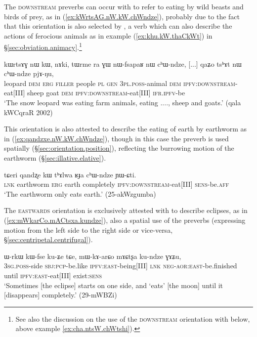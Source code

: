 The \textsc{downstream} preverbs can occur with  to refer to eating by wild beasts and birds of prey, as in (\ref{ex:kWrtsAG.nW.kW.chWndze}), probably due to the fact that this orientation is also selected by , a verb which can also describe the actions of ferocious animals as in example (\ref{ex:khu.kW.thaCkWt}) in §\ref{sec:obviation.animacy}.\footnote{See also the discussion on the use of the \textsc{downstream} orientation with  below, above example \ref{ex:cha.ntsW.chWtshi}).}

\begin{exe}
\ex \label{ex:kWrtsAG.nW.kW.chWndze}
\gll kɯrtsɤɣ nɯ kɯ, nɤki, tɯrme ra ɣɯ nɯ-fsapaʁ nɯ cʰɯ-ndze, [...] qaʑo tsʰɤt nɯ cʰɯ-ndze pjɤ-ŋu, \\
leopard \textsc{dem} \textsc{erg} \textsc{filler} people \textsc{pl} \textsc{gen} \textsc{3pl}.\textsc{poss}-animal \textsc{dem} \textsc{ipfv}:\textsc{downstream}-eat[III] { } sheep goat \textsc{dem} \textsc{ipfv}:\textsc{downstream}-eat[III] \textsc{ifr}.\textsc{ipfv}-be \\
\glt `The snow leopard was eating farm animals, eating ...., sheep and goats.' (qala kWCqraR 2002)
\end{exe}

This orientation is also attested to describe the eating of earth by earthworm as in (\ref{ex:qandzxe.nW.kW.chWndze}), though in this case the preverb is used spatially (§\ref{sec:orientation.position}), reflecting the burrowing motion of the earthworm (§\ref{sec:illative.elative}). 

\begin{exe}
\ex \label{ex:qandzxe.nW.kW.chWndze}
\gll tɕeri qandʐe kɯ tʰɤlwa ʁɟa cʰɯ-ndze ɲɯ-ɕti. \\
\textsc{lnk} earthworm \textsc{erg} earth completely \textsc{ipfv}:\textsc{downstream}-eat[III] \textsc{sens}-be.\textsc{aff} \\
\glt  `The earthworm only eats earth.' (25-akWzgumba)
\end{exe}

The \textsc{eastwards} orientation is exclusively attested with  to describe eclipses, as in (\ref{ex:mWkarCo.mACtsxa.kundze}), also a spatial use of the preverbs (expressing motion from the left side to the right side or vice-versa, §\ref{sec:centripetal.centrifugal}).

\begin{exe}
\ex \label{ex:mWkarCo.mACtsxa.kundze}
\gll ɯ-rkɯ kɯ-fse ku-ʑe tɕe, mɯ-kɤ-arɕo mɤɕtʂa ku-ndze ɣɤʑu, \\
\textsc{3sg}.\textsc{poss}-side \textsc{sbj}:\textsc{pcp}-be.like \textsc{ipfv}:\textsc{east}-being[III] \textsc{lnk} \textsc{neg}-\textsc{aor}:\textsc{east}-be.finished until \textsc{ipfv}:\textsc{east}-eat[III] exist:\textsc{sens} \\
\glt  `Sometimes [the eclipse] starts on one side, and `eats' [the moon] until it [disappears] completely.' (29-mWBZi)
\end{exe}

